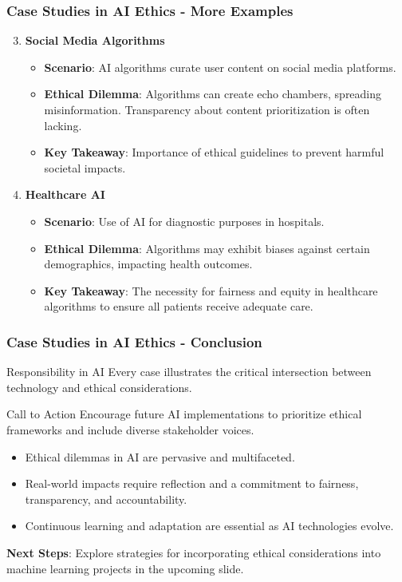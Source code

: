 \documentclass[aspectratio=169]{beamer}
\begin{document}
\begin{frame}[fragile]
    \frametitle{Case Studies in AI Ethics - More Examples}
    \begin{enumerate}
        \setcounter{enumi}{2}
        \item \textbf{Social Media Algorithms}
        \begin{itemize}
            \item \textbf{Scenario}: AI algorithms curate user content on social media platforms.
            \item \textbf{Ethical Dilemma}: Algorithms can create echo chambers, spreading misinformation. Transparency about content prioritization is often lacking.
            \item \textbf{Key Takeaway}: Importance of ethical guidelines to prevent harmful societal impacts.
        \end{itemize}
        
        \item \textbf{Healthcare AI}
        \begin{itemize}
            \item \textbf{Scenario}: Use of AI for diagnostic purposes in hospitals.
            \item \textbf{Ethical Dilemma}: Algorithms may exhibit biases against certain demographics, impacting health outcomes.
            \item \textbf{Key Takeaway}: The necessity for fairness and equity in healthcare algorithms to ensure all patients receive adequate care.
        \end{itemize}
    \end{enumerate}
\end{frame}

\begin{frame}[fragile]
    \frametitle{Case Studies in AI Ethics - Conclusion}
    \begin{block}{Responsibility in AI}
        Every case illustrates the critical intersection between technology and ethical considerations.
    \end{block}

    \begin{block}{Call to Action}
        Encourage future AI implementations to prioritize ethical frameworks and include diverse stakeholder voices.
    \end{block}

    \begin{itemize}
        \item Ethical dilemmas in AI are pervasive and multifaceted.
        \item Real-world impacts require reflection and a commitment to fairness, transparency, and accountability.
        \item Continuous learning and adaptation are essential as AI technologies evolve.
    \end{itemize}

    \textbf{Next Steps}: Explore strategies for incorporating ethical considerations into machine learning projects in the upcoming slide.
\end{frame}
\end{document}
